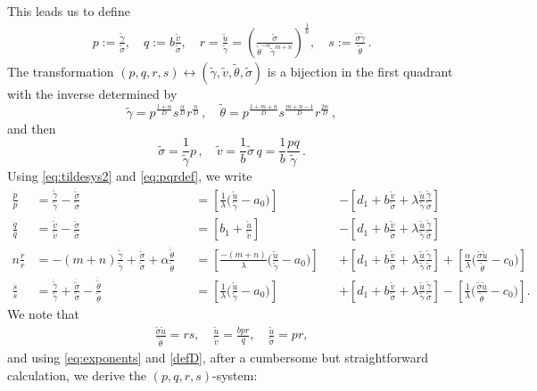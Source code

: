 \documentclass[usletter,11pt]{article}
\def\tg{{\tilde{\gamma}}}
\def\tv{{\tilde{v}}}
\def\tth{{\tilde{\theta}}}
\def\ts{{\tilde{\sigma}}}
\def\tu{{\tilde{u}}}
\def\dtg{{\dot{\tilde{\gamma}}}}
\def\dtv{{\dot{\tilde{v}}}}
\def\dtth{{\dot{\tilde{\theta}}}}
\def\dts{{\dot{\tilde{\sigma}}}}
\def\dpp{\dot{p}}
\def\dqq{\dot{q}}
\def\drr{\dot{r}}
\theoremstyle{remark}
\begin{document}
This leads us to define
\begin{equation}\label{eq:pqrdef} 
 \begin{aligned}
  p :=\frac{\tg}{\ts}, \quad q :=b \frac{\tv}{\ts},  \quad r = \frac{\tu}{\tg} = \left ( \frac{\ts}{ \tth^{-\alpha} \tg^{m+n}} \right )^\frac{1}{n}  , \quad s := \frac{\ts\tg}{\tth} \, .
 \end{aligned}
\end{equation}
The transformation $(p,q,r,s) \leftrightarrow (\tg,\tv, \tth,\ts)$ is a bijection in the first quadrant with the inverse determined by
$$
\tg = p^\frac{1+\alpha}{D} s^\frac{\alpha}{D} r^\frac{n}{D} \, ,  \quad \tth = p^\frac{1+m+n}{D} s^\frac{m+n-1}{D} r^\frac{2n}{D} \, ,
$$
and then
$$
\ts = \frac{1}{\tg} p \, , \quad \tv = \frac{1}{b} \ts \, q = \frac{1}{b} \frac{ p q}{\tg} \, .
$$
Using \eqref{eq:tildesys2} and \eqref{eq:pqrdef}, we write
\begin{align*}
 \frac{\dpp}{p}&=\frac{\dtg}{\tg} - \frac{\dts}{\ts}& &=\left[\frac{1}{\lambda }\Big(\frac{\tu}{\tg}-a_0\Big)\right] & &-\left[d_1 + b\frac{\tv}{\ts} + 
 \lambda   \frac{\tu}{\tg} \frac{\tg}{\ts}  \right]
 \\
 \frac{\dqq}{q}&=\frac{\dtv}{\tv} - \frac{\dts}{\ts}& &=\left[b_1 +\frac{\tu}{\tv}\right] & &-\left[d_1 + b\frac{\tv}{\ts} + \lambda  \frac{\tu}{\tg} \frac{\tg}{\ts}    \right]
 \\
 n\frac{\drr}{r}&=-(m+n)\frac{\dtg}{\tg}+\frac{\dts}{\ts} + \alpha\frac{\dtth}{\tth} & &=\left[\frac{-(m+n)}{\lambda}\Big(\frac{\tu}{\tg}-a_0\Big)\right]& &+
 \left[d_1 + b\frac{\tv}{\ts} + \lambda  \frac{\tu}{\tg} \frac{\tg}{\ts}   \right] + \left[\frac{\alpha}{\lambda }\Big(\frac{\ts\tu}{\tth}-c_0\Big)\right]\\
 \frac{\dot{s}}{s} &= \frac{\dtg}{\tg} + \frac{\dts}{\ts} - \frac{\dtth}{\tth} & &=\left[\frac{1}{\lambda }\Big(\frac{\tu}{\tg}-a_0\Big)\right] & &+\left[d_1 + b\frac{\tv}{\ts} 
 + \lambda  \frac{\tu}{\tg} \frac{\tg}{\ts}  \right] -\left[\frac{1}{\lambda }\Big(\frac{\ts\tu}{\tth}-c_0\Big)\right].%
\end{align*}
We note that
\begin{align*}
 \frac{\ts\tu}{\tth} = rs, \quad \frac{\tu}{\tv} = \frac{bpr}{q}, \quad \frac{\tu}{\ts} = pr,
\end{align*}
and using \eqref{eq:exponents} and \eqref{defD}, after a cumbersome but straightforward calculation, we derive the $(p,q,r,s)$-system:
\end{document}

